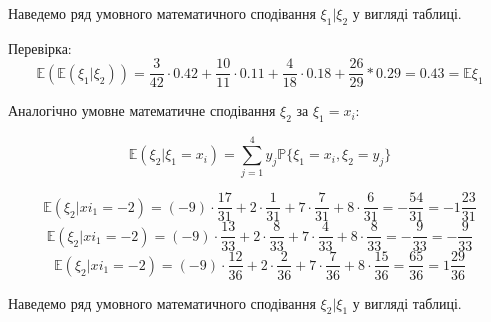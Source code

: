 \documentclass[14pt, a4paper, ukrainian]{extreport}
\begin{document}
	Наведемо ряд умовного математичного сподівання $\xi_1|\xi_2$ у вигляді таблиці.
	\begin{table}[H]
		\caption{\label{tab:E1|E2}Умовне математичне сподівання $\xi_1|\xi_2=y_j$}
		\begin{center}
		\end{center}	
	\end{table}
	
	Перевірка:
	$$\mathbb{E}(\mathbb{E}(\xi_1|\xi_2)) = \frac{3}{42} \cdot 0.42 + \frac{10}{11} \cdot 0.11 + \frac{4}{18} \cdot 0.18 + \frac{26}{29} * 0.29 = 0.43 = \mathbb{E}\xi_1$$
	
	Аналогічно умовне математичне сподівання $\xi_2$ за $\xi_1=x_i$:
	
	$$\mathbb{E}(\xi_2|\xi_1 = x_i) = \sum_{j=1}^{4}y_j\mathbb{P}\{\xi_1=x_i, \xi_2 = y_j\}$$
	
	$$ \mathbb{E}(\xi_2|xi_1=-2) = (-9) \cdot \frac{17}{31} + 2 \cdot \frac{1}{31} + 7 \cdot \frac{7}{31} + 8 \cdot \frac{6}{31} = -\frac{54}{31} = -1\frac{23}{31}$$
	$$ \mathbb{E}(\xi_2|xi_1=-2) = (-9) \cdot \frac{13}{33} + 2 \cdot \frac{8}{33} + 7 \cdot \frac{4}{33} + 8 \cdot \frac{8}{33} = -\frac{9}{33} = -\frac{9}{33}$$
	$$ \mathbb{E}(\xi_2|xi_1=-2) = (-9) \cdot \frac{12}{36} + 2 \cdot \frac{2}{36} + 7 \cdot \frac{7}{36} + 8 \cdot \frac{15}{36} = \frac{65}{36} = 1\frac{29}{36}$$
	
	Наведемо ряд умовного математичного сподівання $\xi_2|\xi_1$ у вигляді таблиці.
	\begin{table}[H]
		\caption{\label{tab:E2|E1}Умовне математичне сподівання $\xi_2|\xi_1=x_i$}
		\begin{center}
		\end{center}	
	\end{table}
	
\end{document}
